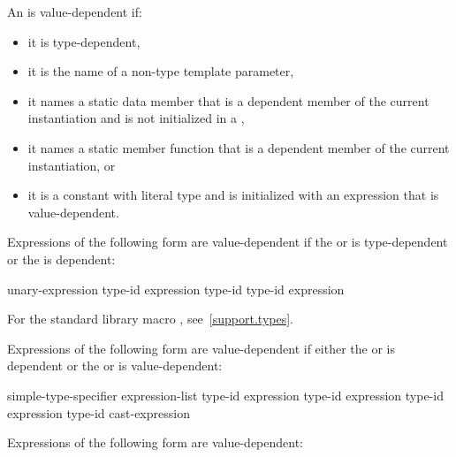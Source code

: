 \pnum
An
is value-dependent if:

\begin{itemize}
\item
it is type-dependent,
\item
it is the name of a non-type template parameter,
\item
it names a static data member that is a dependent member of the current
instantiation and is not initialized in a ,
\item
it names a static member function that is a dependent member of the current
instantiation, or
\item
it is a constant with literal type and is initialized with an
expression that is value-dependent.
\end{itemize}

Expressions of the following form are value-dependent if the
 or 
is type-dependent or the
is dependent:

\begin{ncbnftab}
 unary-expression\br
{} type-id \terminal{)}\br
{} expression \terminal{)}\br
{} type-id \terminal{)}\br
{} type-id \terminal{)}\br
{} \terminal{(} expression \terminal{)}
\end{ncbnftab}

\begin{note} For the standard library macro ,
see~\ref{support.types}.\end{note}

\pnum
Expressions of the following form are value-dependent if either the
or
is dependent or the
or
is value-dependent:

\begin{ncbnftab}
simple-type-specifier \terminal{(} expression-list\opt{} \terminal{)}\br
{} type-id \terminal{> (} expression \terminal{)}\br
{} type-id \terminal{> (} expression \terminal{)}\br
{} type-id \terminal{> (} expression \terminal{)}\br
\terminal{(} type-id \terminal{)} cast-expression
\end{ncbnftab}

\pnum
Expressions of the following form are value-dependent:

